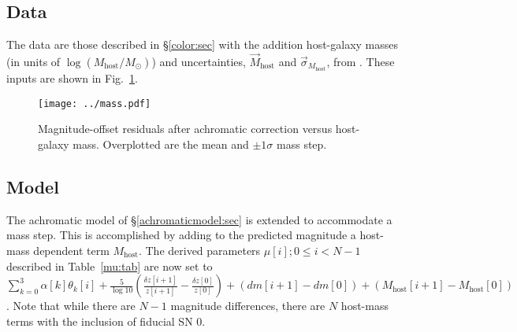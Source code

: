 \documentclass{aastex61}   	%
\begin{document}
\subsection{Data}

%

The data are those described in \S\ref{color:sec} with the addition
host-galaxy masses (in units of $\log{(M_{\mathrm{host}}/M_{\odot})}$) and uncertainties, $\vec{M}_{\text{host}}$  and
$\vec{\sigma}_{M_{\text{host}}}$,
from \citet{2013ApJ...770..108C}. 
These inputs are shown in Fig.~\ref{mass:fig}.

\begin{figure}[htbp] %
   \centering
   \texttt{[image: ../mass.pdf]}
   \caption{Magnitude-offset residuals after achromatic correction versus host-galaxy mass.   Overplotted are the mean
   and $\pm1 \sigma$ mass step.     \label{mass:fig}}
\end{figure}

\subsection{Model}

The achromatic model of \S\ref{achromaticmodel:sec} is extended to accommodate a mass step.
This is accomplished by adding to the predicted magnitude a host-mass dependent term $M_\mathrm{host}$.
The derived parameters
$ \mu[i]; 0 \le i < N-1$ described in  Table~\ref{mu:tab} are now set to   $\sum_{k=0}^{3} \alpha[k] \theta_k[i] + \frac{5}{\log{10}}\left(\frac{\delta z[i+1]}{z[i+1]} -\frac{\delta z[0]}{z[0]}\right) + \left(dm[i+1]-dm[0]\right) + \left(M_\mathrm{host}[i+1]-M_\mathrm{host}[0]\right)$.
Note that while there are $N-1$ magnitude differences, there are $N$ host-mass terms with the inclusion of fiducial SN 0.
\end{document}
